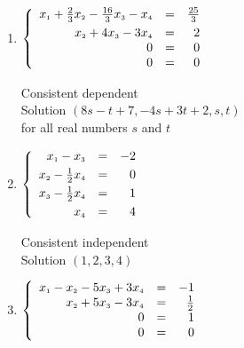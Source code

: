 \documentclass{ximera}
\begin{document}
\begin{enumerate}



\item  $\left\{ \begin{array}{rcr} x_{\mbox{\tiny$1$}} + \frac{2}{3}x_{\mbox{\tiny$2$}} - \frac{16}{3}x_{\mbox{\tiny$3$}} -  x_{\mbox{\tiny$4$}} & = & \frac{25}{3} \\ [3pt]
x_{\mbox{\tiny$2$}} + 4x_{\mbox{\tiny$3$}} - 3x_{\mbox{\tiny$4$}} & = & 2  \\  
0 & = & 0 \\
0 & = & 0  \end{array} \right.$

Consistent dependent\\
Solution $(8s - t + 7, -4s + 3t + 2, s, t)$\\
for all real numbers $s$ and $t$



\item  $\left\{ \begin{array}{rcr} x_{\mbox{\tiny$1$}} - x_{\mbox{\tiny$3$}} & = & -2 \\ [3pt]
x_{\mbox{\tiny$2$}} - \frac{1}{2}x_{\mbox{\tiny$4$}} & = & 0  \\ [3pt]
x_{\mbox{\tiny$3$}} - \frac{1}{2} x_{\mbox{\tiny$4$}} & = & 1 \\ [3pt]
x_{\mbox{\tiny$4$}} & = & 4  \end{array} \right.$

Consistent independent\\
Solution $(1, 2, 3, 4)$



\item  $\left\{ \begin{array}{rcr} x_{\mbox{\tiny$1$}} - x_{\mbox{\tiny$2$}} - 5x_{\mbox{\tiny$3$}} +  3x_{\mbox{\tiny$4$}} & = & -1 \\ 
x_{\mbox{\tiny$2$}} + 5x_{\mbox{\tiny$3$}} - 3x_{\mbox{\tiny$4$}} & = & \frac{1}{2}  \\  
0 & = & 1 \\
0 & = & 0 \end{array} \right.$


\end{enumerate}
\end{document}
